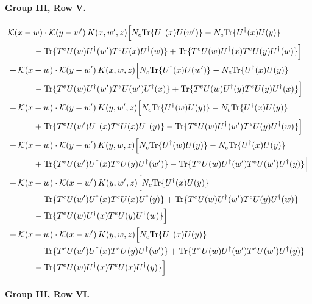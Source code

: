 \documentclass[10pt]{article}
\numberwithin{equation}{section}
\begin{document}
\paragraph{Group III, Row V.}

\begin{align}
&\mathcal K(x-w)\cdot\mathcal K(y-w')\,K(x,w',z)\Big[N_c{\rm Tr}\{U^\dagger(x)U(w')\}-N_c{\rm Tr}\{U^\dagger(x)U(y)\}\notag\\
&\quad\quad\quad-{\rm Tr}\{T^eU(w)U^\dagger(w')T^eU(x)U^\dagger(w)\}+{\rm Tr}\{T^eU(w)U^\dagger(x)T^eU(y)U^\dagger(w)\}\Big]\notag\\
&+\mathcal K(x-w)\cdot\mathcal K(y-w')\,K(x,w,z)\Big[N_c{\rm Tr}\{U^\dagger(x)U(w')\}-N_c{\rm Tr}\{U^\dagger(x)U(y)\}\notag\\
&\quad\quad\quad-{\rm Tr}\{T^eU(w)U^\dagger(w')T^eU(w')U^\dagger(x)\}+{\rm Tr}\{T^eU(w)U^\dagger(y)T^eU(y)U^\dagger(x)\}\Big]\notag\\
&+\mathcal K(x-w)\cdot\mathcal K(y-w')\,K(y,w',z)\Big[N_c{\rm Tr}\{U^\dagger(w)U(y)\}-N_c{\rm Tr}\{U^\dagger(x)U(y)\}\notag\\
&\quad\quad\quad+{\rm Tr}\{T^eU(w')U^\dagger(x)T^eU(x)U^\dagger(y)\}-{\rm Tr}\{T^eU(w)U^\dagger(w')T^eU(y)U^\dagger(w)\}\Big]\notag\\
&+\mathcal K(x-w)\cdot\mathcal K(y-w')\,K(y,w,z)\Big[N_c{\rm Tr}\{U^\dagger(w)U(y)\}-N_c{\rm Tr}\{U^\dagger(x)U(y)\}\notag\\
&\quad\quad\quad+{\rm Tr}\{T^eU(w')U^\dagger(x)T^eU(y)U^\dagger(w')\}-{\rm Tr}\{T^eU(w)U^\dagger(w')T^eU(w')U^\dagger(y)\}\Big]\notag\\
&+\mathcal K(x-w)\cdot\mathcal K(x-w')\,K(y,w',z)\Big[N_c{\rm Tr}\{U^\dagger(x)U(y)\}\notag\\
&\quad\quad\quad-{\rm Tr}\{T^eU(w')U^\dagger(x)T^eU(x)U^\dagger(y)\}+{\rm Tr}\{T^eU(w)U^\dagger(w')T^eU(y)U^\dagger(w)\}\notag\\
&\quad\quad\quad-{\rm Tr}\{T^eU(w)U^\dagger(x)T^eU(y)U^\dagger(w)\}\Big]\notag\\
&+\mathcal K(x-w)\cdot\mathcal K(x-w')\,K(y,w,z)\Big[N_c{\rm Tr}\{U^\dagger(x)U(y)\}\notag\\
&\quad\quad\quad-{\rm Tr}\{T^eU(w')U^\dagger(x)T^eU(y)U^\dagger(w')\}+{\rm Tr}\{T^eU(w)U^\dagger(w')T^eU(w')U^\dagger(y)\}\notag\\
&\quad\quad\quad-{\rm Tr}\{T^eU(w)U^\dagger(x)T^eU(x)U^\dagger(y)\}\Big]
\label{eq:G3V}
\end{align}

\paragraph{Group III, Row VI.}
\end{document}
